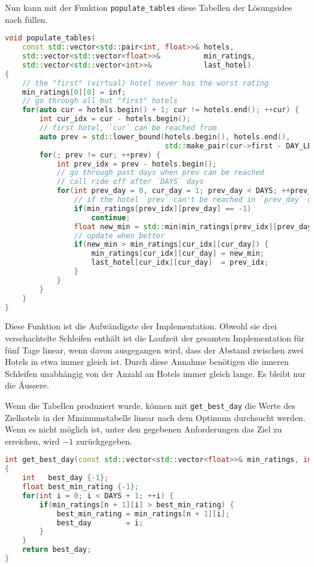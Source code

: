 \documentclass[a4paper,10pt,ngerman]{scrartcl}
\begin{document}
Nun kann mit der Funktion \lstinline{populate_tables} diese Tabellen der Lösungsidee nach füllen.
\begin{lstlisting}[language=C++]
void populate_tables(
    const std::vector<std::pair<int, float>>& hotels,
    std::vector<std::vector<float>>&          min_ratings,
    std::vector<std::vector<int>>&            last_hotel)
{
    // the "first" (virtual) hotel never has the worst rating
    min_ratings[0][0] = inf;
    // go through all but "first" hotels
    for(auto cur = hotels.begin() + 1; cur != hotels.end(); ++cur) {
        int cur_idx = cur - hotels.begin();
        // first hotel, `cur` can be reached from
        auto prev = std::lower_bound(hotels.begin(), hotels.end(),
                                     std::make_pair(cur->first - DAY_LEN, .0f));
        for(; prev != cur; ++prev) {
            int prev_idx = prev - hotels.begin();
            // go through past days when prev can be reached
            // call ride off after `DAYS` days
            for(int prev_day = 0, cur_day = 1; prev_day < DAYS; ++prev_day, ++cur_day) {
                // if the hotel `prev` can't be reached in `prev_day` days
                if(min_ratings[prev_idx][prev_day] == -1)
                    continue;
                float new_min = std::min(min_ratings[prev_idx][prev_day], cur->second);
                // update when better
                if(new_min > min_ratings[cur_idx][cur_day]) {
                    min_ratings[cur_idx][cur_day] = new_min;
                    last_hotel[cur_idx][cur_day]  = prev_idx;
                }
            }
        }
    }
}
\end{lstlisting}
Diese Funktion ist die Aufwändigste der Implementation.
Obwohl sie drei verschachtelte Schleifen enthält ist die Laufzeit der gesamten Implementation für fünf Tage linear, wenn davon ausgegangen wird, dass der Abstand zwischen zwei Hotels in etwa immer gleich ist.
Durch diese Annahme benötigen die inneren Schleifen unabhängig von der Anzahl an Hotels immer gleich lange.
Es bleibt nur die Äussere.

Wenn die Tabellen produziert wurde, können mit \lstinline{get_best_day} die Werte des \glqq{}Zielhotels\grqq{} in der Minimumstabelle linear nach dem Optimum durchsucht werden.
Wenn es nicht möglich ist, unter den gegebenen Anforderungen das Ziel zu erreichen, wird $-1$ zurückgegeben.
\begin{lstlisting}[language=C++]
int get_best_day(const std::vector<std::vector<float>>& min_ratings, int n)
{
    int   best_day {-1};
    float best_min_rating {-1};
    for(int i = 0; i < DAYS + 1; ++i) {
        if(min_ratings[n + 1][i] > best_min_rating) {
            best_min_rating = min_ratings[n + 1][i];
            best_day        = i;
        }
    }
    return best_day;
}
\end{lstlisting}
\end{document}
